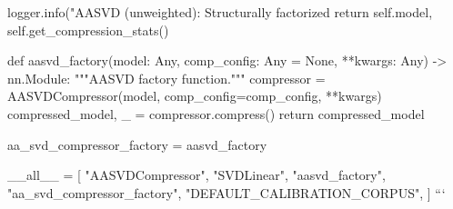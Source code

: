         logger.info("AASVD (unweighted): Structurally factorized %
        return self.model, self.get\_compression\_stats()


def aasvd\_factory(model: Any, comp\_config: Any = None, **kwargs: Any) -> nn.Module:
    """AASVD factory function."""
    compressor = AASVDCompressor(model, comp\_config=comp\_config, **kwargs)
    compressed\_model, \_ = compressor.compress()
    return compressed\_model


aa\_svd\_compressor\_factory = aasvd\_factory

\_\_all\_\_ = [
    "AASVDCompressor",
    "SVDLinear",
    "aasvd\_factory",
    "aa\_svd\_compressor\_factory",
    "DEFAULT\_CALIBRATION\_CORPUS",
]
```
